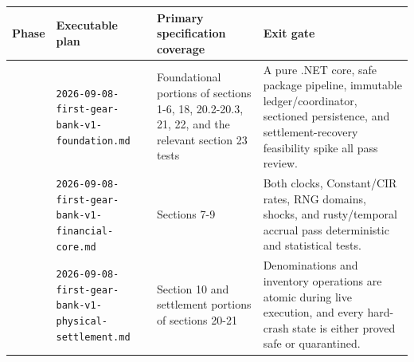 \documentclass[
  9pt,
  letterpaper,
]{extarticle}
\newcounter{none} %
\begin{document}
{\def\LTcaptype{none} %
\begin{longtable}[]{@{}
  >{\raggedright\arraybackslash}p{}
  >{\raggedright\arraybackslash}p{}
  >{\raggedright\arraybackslash}p{}
  >{\raggedright\arraybackslash}p{}@{}}
\toprule\noalign{}
\begin{minipage}[b]{\linewidth}\raggedright
Phase
\end{minipage} & \begin{minipage}[b]{\linewidth}\raggedright
Executable plan
\end{minipage} & \begin{minipage}[b]{\linewidth}\raggedright
Primary specification coverage
\end{minipage} & \begin{minipage}[b]{\linewidth}\raggedright
Exit gate
\end{minipage} \\
\midrule\noalign{}
\endhead
\bottomrule\noalign{}
\endlastfoot
1 &
\texttt{2026-}\allowbreak{}\texttt{09-}\allowbreak{}\texttt{08-}\allowbreak{}\texttt{first-}\allowbreak{}\texttt{gear-}\allowbreak{}\texttt{bank-}\allowbreak{}\texttt{v1-}\allowbreak{}\texttt{foundation.}\allowbreak{}\texttt{md}
& Foundational portions of sections 1-6, 18, 20.2-20.3, 21, 22, and the
relevant section 23 tests & A pure .NET core, safe package pipeline,
immutable ledger/coordinator, sectioned persistence, and
settlement-recovery feasibility spike all pass review. \\
2 &
\texttt{2026-}\allowbreak{}\texttt{09-}\allowbreak{}\texttt{08-}\allowbreak{}\texttt{first-}\allowbreak{}\texttt{gear-}\allowbreak{}\texttt{bank-}\allowbreak{}\texttt{v1-}\allowbreak{}\texttt{financial-}\allowbreak{}\texttt{core.}\allowbreak{}\texttt{md}
& Sections 7-9 & Both clocks, Constant/CIR rates, RNG domains, shocks,
and rusty/temporal accrual pass deterministic and statistical tests. \\
3 &
\texttt{2026-}\allowbreak{}\texttt{09-}\allowbreak{}\texttt{08-}\allowbreak{}\texttt{first-}\allowbreak{}\texttt{gear-}\allowbreak{}\texttt{bank-}\allowbreak{}\texttt{v1-}\allowbreak{}\texttt{physical-}\allowbreak{}\texttt{settlement.}\allowbreak{}\texttt{md}
& Section 10 and settlement portions of sections 20-21 & Denominations
and inventory operations are atomic during live execution, and every
hard-crash state is either proved safe or quarantined. \\

\end{longtable}}
\end{document}

